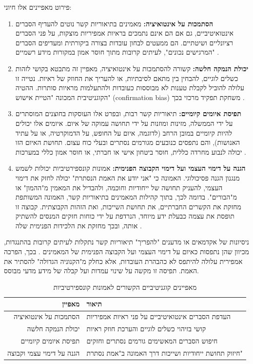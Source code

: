 \documentclass[12pt,a4paper]{article}
\begin{document}
פירוט מאפיינים אלו חיוני:

\begin{enumerate}
    \item \textbf{הסתמכות על אינטואיציה:} מאמינים בתיאוריות קשר נוטים להעדיף הסברים אינטואיטיביים, גם אם הם אינם נתמכים בראיות אמפיריות מוצקות, על פני הסברים רציונליים ושיטתיים. הם ממעטים לבחון עובדות בצורה ביקורתית ומעדיפים הסברים "המרגישים נכונים", לעיתים קרובות מתוך חוסר אמון במקורות מידע רשמיים \cite{4}.
    \item \textbf{יכולת הנמקה חלשה:} קשורה להסתמכות על אינטואיציה, מאפיין זה מתבטא בקושי לזהות כשלים לוגיים, להבחין בין מתאם לסיבתיות, או להעריך את החוזק של ראיות. נטייה זו עלולה להוביל לקבלת טענות לא מבוססות כעובדות ולהתעלמות מראיות סותרות. ההטיה הקוגניטיבית המכונה "הטיית אישוש" (confirmation bias) משחקת תפקיד מרכזי בכך \cite{4}.
    \item \textbf{תפיסת איומים קיומיים:} תיאוריות קשר רבות, ובפרט אלו העוסקות בחוצנים המוסתרים על ידי הממשלה, מזינות ומוזנות על ידי תחושה עמוקה של איום. איומים אלו יכולים להיות קיומיים במובן הרחב (לדוגמה, איום על החופש, על הדמוקרטיה, או על עתיד האנושות), והם נתפסים כנובעים מגורמים נסתרים ובעלי כוח עצום. תחושת האיום הזו יכולה לנבוע מחרדה כללית, חוסר ביטחון אישי או חברתי, או חוסר אמון כללי במערכות \cite{4}.
    \item \textbf{הגנה על דימוי העצמי ועל דימוי הקבוצה הפנימית:} אמונות קונספירטיביות יכולות לשמש מנגנון הגנה פסיכולוגי. האמונה כי "אני יודע את האמת הנסתרת" יכולה לחזק את דימוי העצמי, להעניק תחושה של ייחודיות וחוכמה, ולהבדיל את המאמין מ"ההמון" או מ"הבורים". בדומה לכך, בתוך קהילות המאמינים בתיאוריות קשר, האמונה המשותפת מחזקת את הקשרים החברתיים, את תחושת השייכות, ואת הזהות הקבוצתית. קבוצה זו תופסת את עצמה כבעלת ידע מיוחד, הנרדפת על ידי כוחות חזקים המנסים להשתיק אותה, ובכך מחזקת את הלכידות הפנימית שלה \cite{5}.
\end{enumerate}

ניסיונות של אקדמאים או מדענים "להפריך" תיאוריות קשר נתקלות לעיתים קרובות בהתנגדות, מכיוון שהן נתפסות כאיום על דימוי העצמי ועל הקבוצה הפנימית של המאמינים \cite{4}. בכך, הפרכה אמפירית עלולה להיתפס לא כהבהרת העובדות, אלא כחלק מ"הקנוניה הגדולה" להסתיר את האמת. תפיסה זו מקשה על שינוי עמדות ועל קבלה של מידע מדעי מבוסס.

\begin{table}[ht!]
    \centering
    \caption{מאפיינים קוגניטיביים הקשורים לאמונות קונספירטיביות \cite{4}}
    \label{tab:cognitive_styles}
    \begin{tabular}{|r|l|}
        \hline
        \textbf{מאפיין} & \textbf{תיאור} \\
        \hline
        הסתמכות על אינטואיציה & העדפת הסברים אינטואיטיביים על פני ראיות אמפיריות \\
        יכולת הנמקה חלשה & קושי בזיהוי כשלים לוגיים והערכת חוזק ראיות \\
        תפיסת איומים קיומיים & חיפוש הסברים המאשימים גורמים נסתרים וחזקים \\
        הגנה על דימוי עצמי וקבוצה & חיזוק תחושת ייחודיות ושייכות דרך האמונה ב"אמת נסתרת" \\
        \hline
    \end{tabular}
\end{table}
\end{document}
